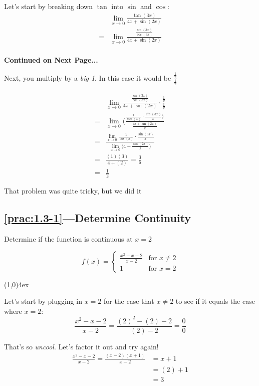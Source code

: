 \documentclass{MathNotes}
\newcommand{\br}{
	\begin{center}
		\line(1,0){4ex}
	\end{center}}
\newcommand{\continued}{
	\mbox{}
	\vfill
	\textbf{Continued on Next Page...}\newpage
}
\begin{document}
Let's start by breaking down $\tan$ into $\sin$ and $\cos$:
\begin{align*}
	  & \lim_{x\to 0}\frac{\tan(3x)}{4x+\sin(2x)}                  \\
	= & \lim_{x\to 0}\frac{\frac{\sin(3x)}{\cos(3x)}}{4x+\sin(2x)} \\
\end{align*}
\continued

Next, you multiply by a \textit{big 1}. In this case it would be
$\displaystyle\frac{\frac{1}{x}}{\frac{1}{x}}$

\begin{align*}
	  & \lim_{x\to 0}\frac{\frac{\sin(3x)}{\cos(3x)}}{4x+\sin(2x)}\cdot\frac{\frac{1}{x}}{\frac{1}{x}}            \\
	= & \lim_{x\to 0}\big(\frac{\frac{1}{\cos(x)}\cdot\frac{\sin(3x)}{x}\big)}{\frac{4x+\sin(2x)}{x}}             \\
	= & \frac{\lim_{x\to 0}\frac{1}{\cos(x)}\cdot\frac{\sin(3x)}{x}}{\lim_{x\to 0}\big(4+\frac{\sin(2x)}{x}\big)} \\
	= & \frac{(1)(3)}{4+(2)}=\frac{3}{6}                                                                          \\
	= & \frac{1}{2}
\end{align*}

That problem was quite tricky, but we did it 

\subsection*{\ref{prac:1.3-1}---Determine Continuity}\label{ans:1.3-1}
Determine if the function is continuous at $x=2$

\begin{displaymath}
	f(x) = \begin{cases}
		\frac{x^2-x-2}{x-2} & \text{for } x\neq 2 \\
		1                   & \text{for } x=2
	\end{cases}
\end{displaymath}
\br

Let's start by plugging in $x=2$ for the case that $x\neq2$ to see if it equals
the case where $x=2$:
\begin{displaymath}
	\frac{x^2-x-2}{x-2}=\frac{(2)^2-(2)-2}{(2)-2}=\frac{0}{0}
\end{displaymath}

That's so \textit{uncool}. Let's factor it out and try again!
\begin{align*}
	\frac{x^2-x-2}{x-2} = \frac{(x-2)(x+1)}{x-2} & = x+1  \\
	                                             & =(2)+1 \\
	                                             & =3
\end{align*}
\end{document}
